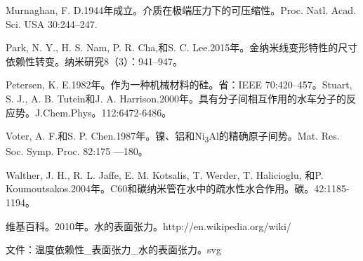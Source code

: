 \documentclass[
]{article}
\begin{document}
Murnaghan, F. D.1944年成立。介质在极端压力下的可压缩性。Proc. Natl.
Acad. Sci. USA 30:244--247.

Park, N. Y., H. S. Nam, P. R. Cha,和S. C.
Lee.2015年。金纳米线变形特性的尺寸依赖性转变。纳米研究8（3）：941--947。

Petersen, K. E.1982年。作为一种机械材料的硅。省：IEEE
70:420--457。Stuart, S. J., A. B. Tutein和J. A.
Harrison.2000年。具有分子间相互作用的水车分子的反应势。J.Chem.Phys。112:6472-6486。

Voter, A. F.和S. P.
Chen.1987年。镍、铝和Ni\textsubscript{3}Al的精确原子间势。Mat. Res. Soc.
Symp. Proc. 82:175 ---180。

Walther, J. H., R. L. Jaffe, E. M. Kotsalis, T. Werder, T. Halicioglu,
和P.
Koumoutsakos.2004年。C60和碳纳米管在水中的疏水性水合作用。碳。42:1185-1194。

维基百科。2010年。水的表面张力。http://en.wikipedia.org/wiki/

文件：温度依赖性\_表面张力\_水的表面张力。svg
\end{document}
